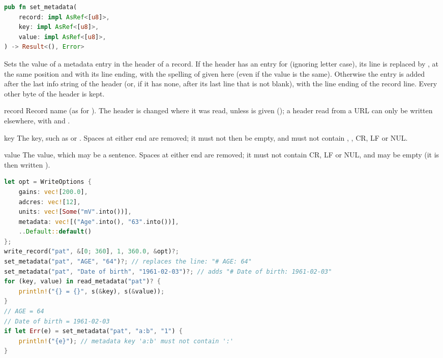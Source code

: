 \begin{lstlisting}[language=Rust,style=signature]
pub fn set_metadata(
    record: impl AsRef<[u8]>,
    key: impl AsRef<[u8]>,
    value: impl AsRef<[u8]>,
) -> Result<(), Error>
\end{lstlisting}
Sets the value of a metadata entry in the header of a record. If the header has an entry
for  (ignoring letter case), its line is replaced by , at
the same position and with its line ending, with the spelling of  given here
(even if the value is the same). Otherwise the entry is added after the last info string
of the header (or, if it has none, after its last line that is not blank), with the line
ending of the record line. Every other byte of the header is kept.
\begin{params}
\item[record] Record name (as for ). The header is changed where it
  was read, unless  is given (); a header read from a
  URL can only be written elsewhere, with  and .
\item[key] The key, such as  or . Spaces at either end
  are removed; it must not then be empty, and must not contain \code{:}, \code{\#}, CR,
  LF or NUL.
\item[value] The value, which may be a sentence. Spaces at either end are removed; it
  must not contain CR, LF or NUL, and may be empty (it is then written ).
\end{params}
\begin{lstlisting}[language=Rust,style=example]
let opt = WriteOptions {
    gains: vec![200.0],
    adcres: vec![12],
    units: vec![Some("mV".into())],
    metadata: vec![("Age".into(), "63".into())],
    ..Default::default()
};
write_record("pat", &[0; 360], 1, 360.0, &opt)?;
set_metadata("pat", "AGE", "64")?; // replaces the line: "# AGE: 64"
set_metadata("pat", "Date of birth", "1961-02-03")?; // adds "# Date of birth: 1961-02-03"
for (key, value) in read_metadata("pat")? {
    println!("{} = {}", s(&key), s(&value));
}
// AGE = 64
// Date of birth = 1961-02-03
if let Err(e) = set_metadata("pat", "a:b", "1") {
    println!("{e}"); // metadata key 'a:b' must not contain ':'
}
\end{lstlisting}


